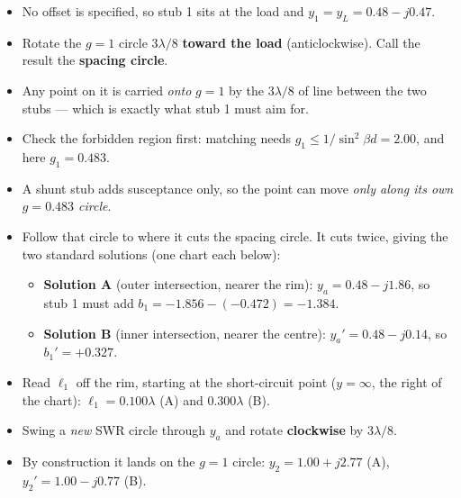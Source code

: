 \begin{itemize}
  \item No offset is specified, so stub 1 sits at the load and $y_1 = y_L = 0.48 - j0.47$.
\end{itemize}
\begin{itemize}
  \item Rotate the $g=1$ circle $3\lambda/8$ \textbf{toward the load} (anticlockwise). Call the result the \textbf{spacing circle}.
  \item Any point on it is carried \emph{onto} $g=1$ by the $3\lambda/8$ of line between the two stubs --- which is exactly what stub 1 must aim for.
  \item Check the forbidden region first: matching needs $g_1 \le 1/\sin^2\beta d = 2.00$, and here $g_1 = 0.483$. \checkmark
\end{itemize}
\begin{itemize}
  \item A shunt stub adds susceptance only, so the point can move \emph{only along its own $g = 0.483$ circle}.
  \item Follow that circle to where it cuts the spacing circle. It cuts twice, giving the two standard solutions (one chart each below):
  \begin{itemize}
    \item \textbf{Solution A} (outer intersection, nearer the rim): $y_a = 0.48 - j1.86$, so stub 1 must add $b_1 = -1.856 - (-0.472) = -1.384$.
    \item \textbf{Solution B} (inner intersection, nearer the centre): $y_a' = 0.48 - j0.14$, so $b_1' = +0.327$.
  \end{itemize}
  \item Read $\ell_1$ off the rim, starting at the short-circuit point ($y=\infty$, the right of the chart): $\ell_1 = 0.100\lambda$ (A) and $0.300\lambda$ (B).
\end{itemize}
\begin{itemize}
  \item Swing a \emph{new} SWR circle through $y_a$ and rotate \textbf{clockwise} by $3\lambda/8$.
  \item By construction it lands on the $g=1$ circle: $y_2 = 1.00 + j2.77$ (A), $y_2' = 1.00 - j0.77$ (B).
\end{itemize}
